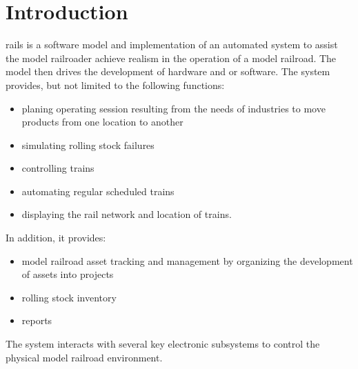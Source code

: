 \chapter{Introduction}
\gls{rails} is a software model and implementation of an automated system to assist the model railroader achieve realism in the operation of a model railroad. The model then drives the development of hardware and or software.
The system provides, but not limited to the following functions:
\begin{itemize}
  \item planing operating session resulting from the needs of industries to move products from one location to another
  \item simulating rolling stock failures
  \item controlling trains
  \item automating regular scheduled trains 
  \item displaying the rail network and location of trains.
\end{itemize}
In addition, it provides:
\begin{itemize}
  \item model railroad asset tracking and management by organizing the development of assets into projects
  \item rolling stock inventory
  \item reports
\end{itemize} 
The system interacts with several key electronic subsystems to control the physical model railroad environment.
